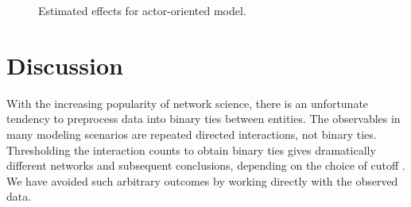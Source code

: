 \documentclass[final]{statsoc}
\begin{document}
\begin{figure}
\centering
{}
\qquad
{}
\caption{
  Estimated effects for actor-oriented model.
}
\end{figure}

\FloatBarrier

\section{Discussion}\label{S:discussion}

With the increasing popularity of network science, there is an unfortunate
tendency to preprocess data into binary ties between entities.
The observables in many modeling scenarios are repeated directed interactions,
not binary ties.  Thresholding the interaction counts to obtain binary ties
gives dramatically different networks and subsequent conclusions, depending on
the choice of cutoff \citep{dechoudhury2010}.  We have avoided such arbitrary
outcomes by working directly with the observed data.
\end{document}
